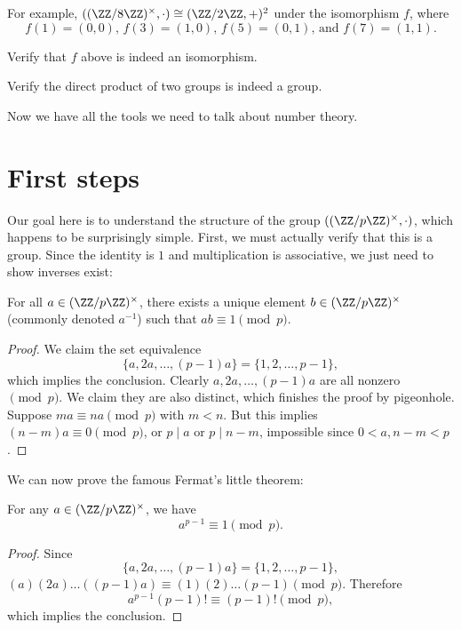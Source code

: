 \documentclass[11pt]{scrartcl}
\begin{document}
For example, $((\ZZ/8\ZZ)^\times,\cdot) \cong (\ZZ/2\ZZ,+)^2$ under the isomorphism $f$, where
\[f(1) = (0,0)\text{, }f(3) = (1,0)\text{, }f(5) = (0,1)\text{, and }f(7) = (1,1).\]

\begin{exercise}
	Verify that $f$ above is indeed an isomorphism.
\end{exercise}

\begin{exercise}
	Verify the direct product of two groups is indeed a group.
\end{exercise}

Now we have all the tools we need to talk about number theory.

\section{First steps}

Our goal here is to understand the structure of the group $((\ZZ/p\ZZ)^\times,\cdot)$, which happens to be surprisingly simple. First, we must actually verify that this is a group. Since the identity is $1$ and multiplication is associative, we just need to show inverses exist:

\begin{theorem}
	For all $a \in (\ZZ/p\ZZ)^\times$, there exists a unique element $b \in (\ZZ/p\ZZ)^\times$ (commonly denoted $a^{-1}$) such that $ab \equiv 1 \pmod{p}$.
\end{theorem}

\begin{proof}
	We claim the set equivalence
	\[\{a,2a,\dots,(p - 1)a\} = \{1,2,\dots,p - 1\},\]
	which implies the conclusion. Clearly $a,2a,\dots,(p - 1)a$ are all nonzero $\pmod{p}$. We claim they are also distinct, which finishes the proof by pigeonhole. Suppose $ma \equiv na \pmod{p}$ with $m < n$. But this implies $(n - m)a \equiv 0 \pmod{p}$, or $p \mid a$ or $p \mid n - m$, impossible since $0 < a, n - m < p$.
\end{proof}

We can now prove the famous Fermat's little theorem:

\begin{theorem}
	For any $a \in (\ZZ/p\ZZ)^\times$, we have
	\[a^{p - 1} \equiv 1 \pmod{p}.\]
\end{theorem}

\begin{proof}
	Since
	\[\{a,2a,\dots,(p - 1)a\} = \{1,2,\dots,p - 1\},\]
	$(a)(2a)\dots((p - 1)a) \equiv (1)(2)\dots(p - 1) \pmod{p}$. Therefore
	\[a^{p - 1}(p - 1)! \equiv (p - 1)! \pmod{p},\]
	which implies the conclusion.
\end{proof}
\end{document}
